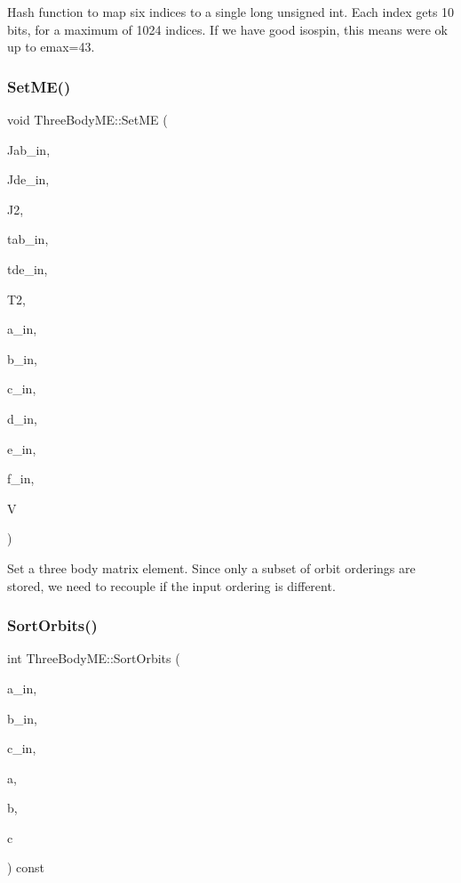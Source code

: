 Hash function to map six indices to a single long unsigned int. Each index gets 10 bits, for a maximum of 1024 indices. If we have good isospin, this means we\textquotesingle{}re ok up to emax=43. \mbox{\label{classThreeBodyME_ad316c3872bdd9f08e0ccc1efda8bb93b}} 
\subsubsection{\texorpdfstring{Set\+M\+E()}{SetME()}}
{\footnotesize\ttfamily void Three\+Body\+M\+E\+::\+Set\+ME (\begin{DoxyParamCaption}\item[{int}]{Jab\+\_\+in,  }\item[{int}]{Jde\+\_\+in,  }\item[{int}]{J2,  }\item[{int}]{tab\+\_\+in,  }\item[{int}]{tde\+\_\+in,  }\item[{int}]{T2,  }\item[{int}]{a\+\_\+in,  }\item[{int}]{b\+\_\+in,  }\item[{int}]{c\+\_\+in,  }\item[{int}]{d\+\_\+in,  }\item[{int}]{e\+\_\+in,  }\item[{int}]{f\+\_\+in,  }\item[{Three\+B\+M\+E\+\_\+type}]{V }\end{DoxyParamCaption})}

Set a three body matrix element. Since only a subset of orbit orderings are stored, we need to recouple if the input ordering is different. \mbox{\label{classThreeBodyME_a010cb75dc914b87796422d5f462d866d}} 
\subsubsection{\texorpdfstring{Sort\+Orbits()}{SortOrbits()}}
{\footnotesize\ttfamily int Three\+Body\+M\+E\+::\+Sort\+Orbits (\begin{DoxyParamCaption}\item[{int}]{a\+\_\+in,  }\item[{int}]{b\+\_\+in,  }\item[{int}]{c\+\_\+in,  }\item[{int \&}]{a,  }\item[{int \&}]{b,  }\item[{int \&}]{c }\end{DoxyParamCaption}) const}

